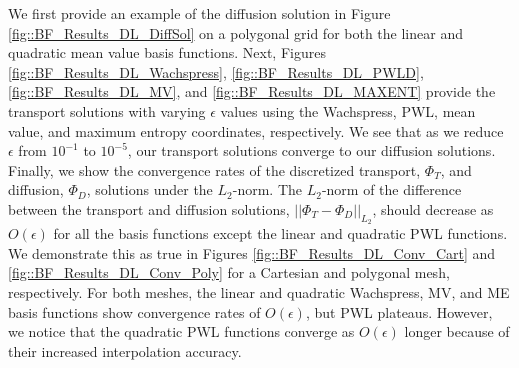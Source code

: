 We first provide an example of the diffusion solution in Figure \ref{fig::BF_Results_DL_DiffSol} on a polygonal grid for both the linear and quadratic mean value basis functions. Next, Figures \ref{fig::BF_Results_DL_Wachspress}, \ref{fig::BF_Results_DL_PWLD}, \ref{fig::BF_Results_DL_MV}, and \ref{fig::BF_Results_DL_MAXENT} provide the transport solutions with varying $\epsilon$ values using the Wachspress, PWL, mean value, and maximum entropy coordinates, respectively. We see that as we reduce $\epsilon$ from $10^{-1}$ to $10^{-5}$, our transport solutions converge to our diffusion solutions. Finally, we show the convergence rates of the discretized transport, $\Phi_T$, and diffusion, $\Phi_D$, solutions under the $L_2$-norm. The $L_2$-norm of the difference between the transport and diffusion solutions, $|| \Phi_T - \Phi_D||_{L_2}$, should decrease as $O(\epsilon)$ for all the basis functions except the linear and quadratic PWL functions. We demonstrate this as true in Figures \ref{fig::BF_Results_DL_Conv_Cart} and \ref{fig::BF_Results_DL_Conv_Poly} for a Cartesian and polygonal mesh, respectively. For both meshes, the linear and quadratic Wachspress, MV, and ME basis functions show convergence rates of $O(\epsilon)$, but PWL plateaus. However, we notice that the quadratic PWL functions converge as $O(\epsilon)$ longer because of their increased interpolation accuracy.


